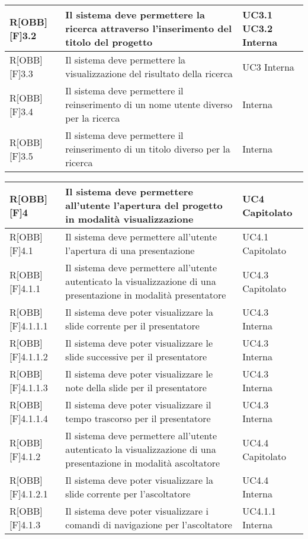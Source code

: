 \begin{table}[H]
\begin{tabular}{|p{}|p{}|p{}|}
			R[OBB][F]3.2 & Il sistema deve permettere la ricerca attraverso
			l'inserimento del titolo del progetto & UC3.1 UC3.2 Interna\\ \midrule 
			R[OBB][F]3.3 & Il sistema deve permettere la visualizzazione del risultato della ricerca & UC3 Interna\\ \midrule 
			R[OBB][F]3.4 & Il sistema deve permettere il reinserimento di un nome utente diverso per la ricerca & Interna\\ \midrule 
			R[OBB][F]3.5 & Il sistema deve permettere il reinserimento di un titolo diverso per la ricerca & Interna\\ \midrule 
		\end{tabular}
	\end{table}
	\newpage

	\begin{table}[H]
		\begin{tabular}{|p{}|p{}|p{}|}
			\midrule
			R[OBB][F]4 & Il sistema deve permettere all'utente l'apertura del progetto in modalità visualizzazione & UC4 Capitolato\\ \midrule 
			R[OBB][F]4.1 & Il sistema deve permettere all'utente l'apertura di
			una presentazione & UC4.1 Capitolato\\ \midrule 
			R[OBB][F]4.1.1 & Il sistema deve permettere all'utente autenticato
			la visualizzazione di una presentazione in modalità
			presentatore & UC4.3 Capitolato\\ \midrule 
			R[OBB][F]4.1.1.1 & Il sistema deve poter visualizzare la slide corrente
			per il presentatore & UC4.3 Interna\\ \midrule 
			R[OBB][F]4.1.1.2 & Il sistema deve poter visualizzare le slide successive
			per il presentatore & UC4.3 Interna\\ \midrule 
			R[OBB][F]4.1.1.3 & Il sistema deve poter visualizzare le note della slide per il presentatore & UC4.3 Interna\\ \midrule 
			R[OBB][F]4.1.1.4 & Il sistema deve poter visualizzare il tempo trascorso per il presentatore & UC4.3 Interna\\ \midrule 
			R[OBB][F]4.1.2 & Il sistema deve permettere all'utente autenticato
			la visualizzazione di una presentazione in modalità
			ascoltatore & UC4.4 Capitolato\\ \midrule 
			R[OBB][F]4.1.2.1 & Il sistema deve poter visualizzare la slide corrente
			per l'ascoltatore & UC4.4 Interna\\ \midrule 
			R[OBB][F]4.1.3 & Il sistema deve poter visualizzare i comandi di navigazione per l'ascoltatore & UC4.1.1 Interna\\ \midrule 

\end{tabular}
\end{table}
